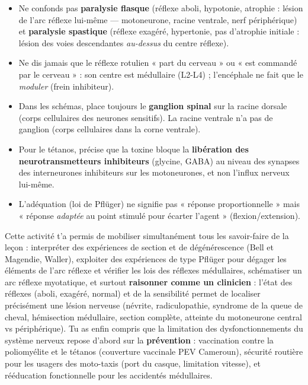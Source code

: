 \documentclass[11pt]{article}
\newcounter{popsec}
\newcounter{popsub}
\newcommand{\courssub}[1]{%
  \stepcounter{popsub}%
  \par\vspace{9pt}\noindent{\popxbold\fontsize{11.5}{13}\selectfont\color{popink}{\color{poporange}\thepopsec.\thepopsub}\hspace{6pt}#1}\par\nopagebreak\vspace{4pt}
}
\begin{document}
\begin{attention}
\begin{itemize}
\item Ne confonds pas \textbf{paralysie flasque} (réflexe aboli, hypotonie, atrophie : lésion de l'arc réflexe lui-même — motoneurone, racine ventrale, nerf périphérique) et \textbf{paralysie spastique} (réflexe exagéré, hypertonie, pas d'atrophie initiale : lésion des voies descendantes \emph{au-dessus} du centre réflexe).
\item Ne dis jamais que le réflexe rotulien « part du cerveau » ou « est commandé par le cerveau » : son centre est médullaire (L2-L4) ; l'encéphale ne fait que le \emph{moduler} (frein inhibiteur).
\item Dans les schémas, place toujours le \textbf{ganglion spinal} sur la racine dorsale (corps cellulaires des neurones sensitifs). La racine ventrale n'a pas de ganglion (corps cellulaires dans la corne ventrale).
\item Pour le tétanos, précise que la toxine bloque la \textbf{libération des neurotransmetteurs inhibiteurs} (glycine, GABA) au niveau des synapses des interneurones inhibiteurs sur les motoneurones, et non l'influx nerveux lui-même.
\item L'adéquation (loi de Pflüger) ne signifie pas « réponse proportionnelle » mais « réponse \emph{adaptée} au point stimulé pour écarter l'agent » (flexion/extension).
\end{itemize}
\end{attention}

\courssub{Bilan de l'activité}

Cette activité t'a permis de mobiliser simultanément tous les savoir-faire de la leçon : interpréter des expériences de section et de dégénérescence (Bell et Magendie, Waller), exploiter des expériences de type Pflüger pour dégager les éléments de l'arc réflexe et vérifier les lois des réflexes médullaires, schématiser un arc réflexe myotatique, et surtout \textbf{raisonner comme un clinicien} : l'état des réflexes (aboli, exagéré, normal) et de la sensibilité permet de localiser précisément une lésion nerveuse (névrite, radiculopathie, syndrome de la queue de cheval, hémisection médullaire, section complète, atteinte du motoneurone central vs périphérique). Tu as enfin compris que la limitation des dysfonctionnements du système nerveux repose d'abord sur la \textbf{prévention} : vaccination contre la poliomyélite et le tétanos (couverture vaccinale PEV Cameroun), sécurité routière pour les usagers des moto-taxis (port du casque, limitation vitesse), et rééducation fonctionnelle pour les accidentés médullaires.
\end{document}
